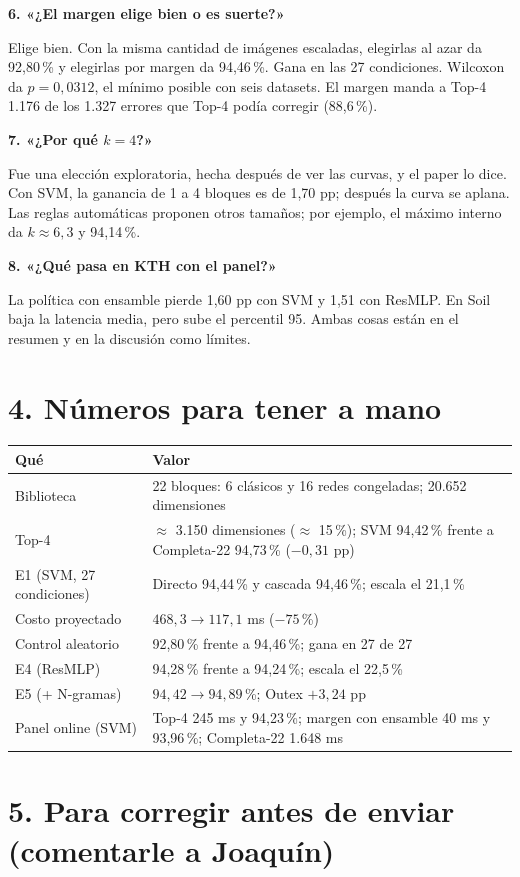 \documentclass[11pt,a4paper]{article}
\newcommand{\preg}[1]{\par\medskip\textbf{\color{azulosc}#1}\par}
\begin{document}
\preg{6. «¿El margen elige bien o es suerte?»}
Elige bien. Con la misma cantidad de imágenes escaladas, elegirlas al azar da 92,80\,\% y elegirlas por margen da 94,46\,\%. Gana en las 27 condiciones. Wilcoxon da $p=0{,}0312$, el mínimo posible con seis datasets. El margen manda a Top-4 1.176 de los 1.327 errores que Top-4 podía corregir (88,6\,\%).

\preg{7. «¿Por qué $k=4$?»}
Fue una elección exploratoria, hecha después de ver las curvas, y el paper lo dice. Con SVM, la ganancia de 1 a 4 bloques es de 1,70 pp; después la curva se aplana. Las reglas automáticas proponen otros tamaños; por ejemplo, el máximo interno da $k\approx6{,}3$ y 94,14\,\%.

\preg{8. «¿Qué pasa en KTH con el panel?»}
La política con ensamble pierde 1,60 pp con SVM y 1,51 con ResMLP. En Soil baja la latencia media, pero sube el percentil 95. Ambas cosas están en el resumen y en la discusión como límites.

\section{4. Números para tener a mano}

\begin{tabularx}{\textwidth}{@{}lY@{}}
\toprule
\textbf{Qué} & \textbf{Valor} \\
\midrule
Biblioteca & 22 bloques: 6 clásicos y 16 redes congeladas; 20.652 dimensiones \\
Top-4 & $\approx$ 3.150 dimensiones ($\approx$ 15\,\%); SVM 94,42\,\% frente a Completa-22 94,73\,\% ($-0{,}31$ pp) \\
E1 (SVM, 27 condiciones) & Directo 94,44\,\% y cascada 94,46\,\%; escala el 21,1\,\% \\
Costo proyectado & $468{,}3 \to 117{,}1$ ms ($-75$\,\%) \\
Control aleatorio & 92,80\,\% frente a 94,46\,\%; gana en 27 de 27 \\
E4 (ResMLP) & 94,28\,\% frente a 94,24\,\%; escala el 22,5\,\% \\
E5 (+ N-gramas) & $94{,}42 \to 94{,}89$\,\%; Outex $+3{,}24$ pp \\
Panel online (SVM) & Top-4 245 ms y 94,23\,\%; margen con ensamble 40 ms y 93,96\,\%; Completa-22 1.648 ms \\
\bottomrule
\end{tabularx}

\section{5. Para corregir antes de enviar (comentarle a Joaquín)}
\end{document}
